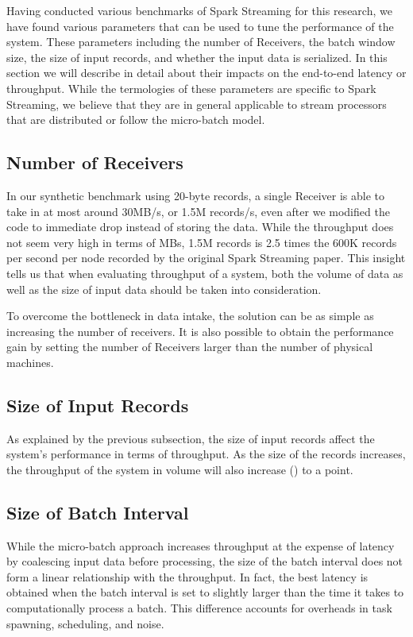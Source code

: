 Having conducted various benchmarks of Spark Streaming for this research, we have found various parameters that can be used to tune the performance of the system. These parameters including the number of Receivers, the batch window size, the size of input records, and whether the input data is serialized. In this section we will describe in detail about their impacts on the end-to-end latency or throughput. While the termologies of these parameters are specific to Spark Streaming, we believe that they are in general applicable to stream processors that are distributed or follow the micro-batch model.

\subsection{Number of Receivers}
In our synthetic benchmark using 20-byte records, a single Receiver is able to take in at most around 30MB/s, or 1.5M records/s, even after we modified the code to immediate drop instead of storing the data. While the throughput does not seem very high in terms of MBs, 1.5M records is 2.5 times the 600K records per second per node recorded by the original Spark Streaming paper. This insight tells us that when evaluating throughput of a system, both the volume of data as well as the size of input data should be taken into consideration.

To overcome the bottleneck in data intake, the solution can be as simple as increasing the number of receivers. It is also possible to obtain the performance gain by setting the number of Receivers larger than the number of physical machines. 

\subsection{Size of Input Records}
As explained by the previous subsection, the size of input records affect the system's performance in terms of throughput. As the size of the records increases, the throughput of the system in volume will also increase () to a point. 

\subsection{Size of Batch Interval}
While the micro-batch approach increases throughput at the expense of latency by coalescing input data before processing, the size of the batch interval does not form a linear relationship with the throughput. In fact, the best latency is obtained when the batch interval is set to slightly larger than the time it takes to computationally process a batch. This difference accounts for overheads in task spawning, scheduling, and noise.

